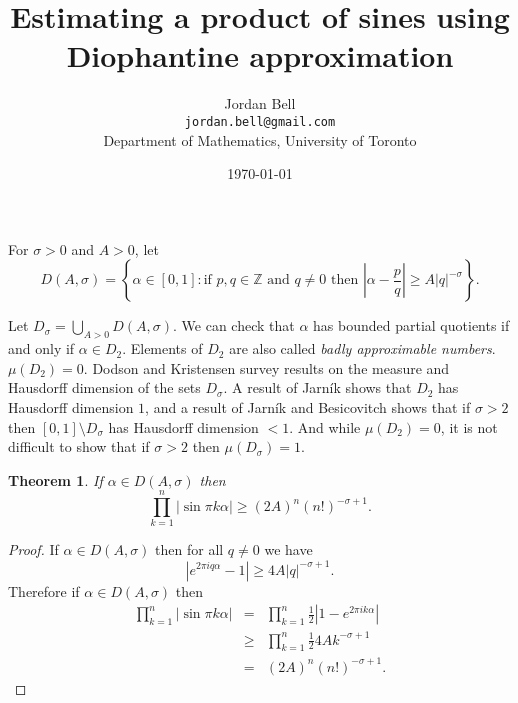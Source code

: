 \documentclass{article}
\newtheorem{theorem}{Theorem}
\begin{document}
\title{Estimating a product of sines using Diophantine approximation}
\author{Jordan Bell\\ \texttt{jordan.bell@gmail.com}\\Department of Mathematics, University of Toronto}
\date{\today}

\maketitle

For $\sigma >0$ and $A>0$, let
\[
D(A,\sigma)=\left\{\alpha \in [0,1]: \textrm{if} \, \, p,q \in \mathbb{Z} \, \, \textrm{and} \, \, q \neq 0 \, \, \textrm{then} \, \, \left| \alpha-\frac{p}{q} \right| \geq A |q|^{-\sigma} \right\}.
\]


Let $D_\sigma=\bigcup_{A>0} D(A,\sigma)$. We can check that $\alpha$ has bounded partial quotients if and only if $\alpha \in D_2$.
Elements of $D_2$ are also called {\em badly approximable numbers}. $\mu(D_2)=0$. Dodson and Kristensen \cite[\S \S 3--4]{MR2112110} survey results on the measure and Hausdorff dimension
of the sets $D_\sigma$. A result of Jarn\'ik \cite[Theorem 4.3]{MR2112110} shows that $D_2$ has Hausdorff dimension $1$, and a result of Jarn\'ik and Besicovitch \cite[Theorem 4.4]{MR2112110} shows that if $\sigma>2$ then $[0,1] \setminus D_\sigma$ has Hausdorff dimension $<1$. And while $\mu(D_2)=0$, it is not difficult to show that if $\sigma>2$ then $\mu(D_\sigma)=1$.



\begin{theorem}
If $\alpha \in D(A,\sigma)$ then 
\[
\prod_{k=1}^n |\sin \pi k \alpha| \geq (2A)^n (n!)^{-\sigma+1}.
\]
\end{theorem}
\begin{proof}
If $\alpha \in D(A,\sigma)$ then
for all $q \neq0$ we have
\[
|e^{2\pi iq\alpha}-1| \geq 4A|q|^{-\sigma+1}.
\]
Therefore if $\alpha \in D(A,\sigma)$ then 
\begin{eqnarray*}
\prod_{k=1}^n |\sin \pi k \alpha|&=&\prod_{k=1}^n \frac{1}{2}\left| 1-e^{2\pi ik\alpha}   \right|\\
&\geq&\prod_{k=1}^n \frac{1}{2} 4A k^{-\sigma+1}\\
&=&(2A)^n (n!)^{-\sigma+1}.
\end{eqnarray*}
\end{proof}
\end{document}
